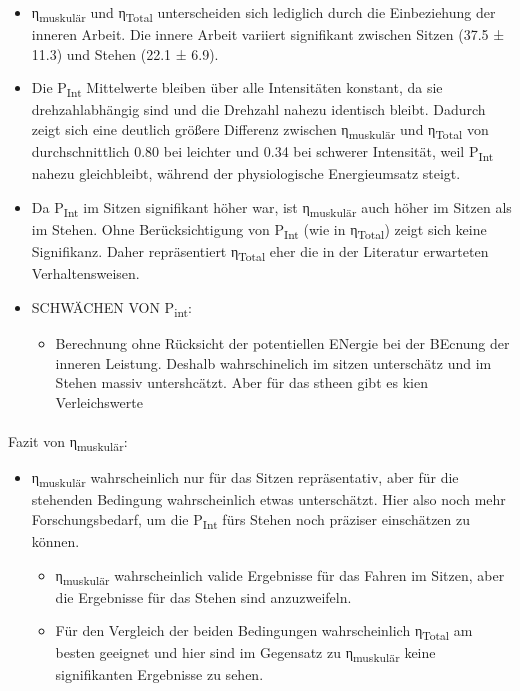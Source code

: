 \documentclass[
  letterpaper,
  DIV=11]{scrartcl}
\makeatletter
\let\oldparagraph\paragraph
\renewcommand{\paragraph}{
    \@ifstar
      \xxxParagraphStar
      \xxxParagraphNoStar
  }
\newcommand{\xxxParagraphStar}[1]{\oldparagraph*{#1}\mbox{}}
\newcommand{\xxxParagraphNoStar}[1]{\oldparagraph{#1}\mbox{}}
\providecommand{\tightlist}{%
  \setlength{\itemsep}{0pt}\setlength{\parskip}{0pt}}\usepackage{longtable,booktabs,array}
\makeatother
\begin{document}
\begin{itemize}
\item
  η\textsubscript{muskulär} und η\textsubscript{Total} unterscheiden
  sich lediglich durch die Einbeziehung der inneren Arbeit. Die innere
  Arbeit variiert signifikant zwischen Sitzen (37.5 ± 11.3) und Stehen
  (22.1 ± 6.9).
\item
  Die P\textsubscript{Int} Mittelwerte bleiben über alle Intensitäten
  konstant, da sie drehzahlabhängig sind und die Drehzahl nahezu
  identisch bleibt. Dadurch zeigt sich eine deutlich größere Differenz
  zwischen η\textsubscript{muskulär} und η\textsubscript{Total} von
  durchschnittlich 0.80 bei leichter und 0.34 bei schwerer Intensität,
  weil P\textsubscript{Int} nahezu gleichbleibt, während der
  physiologische Energieumsatz steigt.
\item
  Da P\textsubscript{Int} im Sitzen signifikant höher war, ist
  η\textsubscript{muskulär} auch höher im Sitzen als im Stehen. Ohne
  Berücksichtigung von P\textsubscript{Int} (wie in
  η\textsubscript{Total}) zeigt sich keine Signifikanz. Daher
  repräsentiert η\textsubscript{Total} eher die in der Literatur
  erwarteten Verhaltensweisen.
\item
  SCHWÄCHEN VON P\textsubscript{int}:

  \begin{itemize}
  \tightlist
  \item
    Berechnung ohne Rücksicht der potentiellen ENergie bei der BEcnung
    der inneren Leistung. Deshalb wahrschinelich im sitzen unterschätz
    und im Stehen massiv untershcätzt. Aber für das stheen gibt es kien
    Verleichswerte
  \end{itemize}
\end{itemize}

\paragraph{\texorpdfstring{Fazit von
η\textsubscript{muskulär}:}{Fazit von ηmuskulär:}}\label{fazit-von-ux3b7muskuluxe4r}

\begin{itemize}
\item
  η\textsubscript{muskulär} wahrscheinlich nur für das Sitzen
  repräsentativ, aber für die stehenden Bedingung wahrscheinlich etwas
  unterschätzt. Hier also noch mehr Forschungsbedarf, um die
  P\textsubscript{Int} fürs Stehen noch präziser einschätzen zu können.

  \begin{itemize}
  \item
    η\textsubscript{muskulär} wahrscheinlich valide Ergebnisse für das
    Fahren im Sitzen, aber die Ergebnisse für das Stehen sind
    anzuzweifeln.
  \item
    Für den Vergleich der beiden Bedingungen wahrscheinlich
    η\textsubscript{Total} am besten geeignet und hier sind im Gegensatz
    zu η\textsubscript{muskulär} keine signifikanten Ergebnisse zu
    sehen.
  \end{itemize}
\end{itemize}
\end{document}

